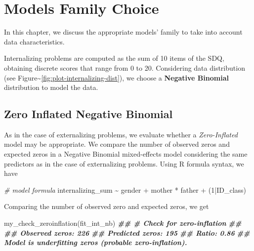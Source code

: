 \documentclass[
]{book}
\newenvironment{Shaded}{\begin{snugshade}}{\end{snugshade}}
\newcommand{\CommentTok}[1]{\textcolor[rgb]{0.56,0.35,0.01}{\textit{#1}}}
\newcommand{\DecValTok}[1]{\textcolor[rgb]{0.00,0.00,0.81}{#1}}
\newcommand{\DocumentationTok}[1]{\textcolor[rgb]{0.56,0.35,0.01}{\textbf{\textit{#1}}}}
\newcommand{\FunctionTok}[1]{\textcolor[rgb]{0.00,0.00,0.00}{#1}}
\newcommand{\NormalTok}[1]{#1}
\newcommand{\SpecialCharTok}[1]{\textcolor[rgb]{0.00,0.00,0.00}{#1}}
\begin{document}
\hypertarget{model-choice-int}{%
\chapter{Models Family Choice}\label{model-choice-int}}

In this chapter, we discuss the appropriate models' family to take into account data characteristics.

Internalizing problems are computed as the sum of 10 items of the SDQ, obtaining discrete scores that range from 0 to 20. Considering data distribution (see Figure\textasciitilde\ref{fig:plot-internalizing-dist}), we choose a \textbf{Negative Binomial} distribution to model the data.

\hypertarget{zero-inflated-negative-binomial-1}{%
\section{Zero Inflated Negative Binomial}\label{zero-inflated-negative-binomial-1}}

As in the case of externalizing problems, we evaluate whether a \emph{Zero-Inflated} model may be appropriate. We compare the number of observed zeros and expected zeros in a Negative Binomial mixed-effects model considering the same predictors as in the case of externalizing problems. Using R formula syntax, we have

\begin{Shaded}
\begin{Highlighting}[]
\CommentTok{\# model formula}
\NormalTok{internalizing\_sum }\SpecialCharTok{\textasciitilde{}}\NormalTok{ gender }\SpecialCharTok{+}\NormalTok{ mother }\SpecialCharTok{*}\NormalTok{ father }\SpecialCharTok{+}\NormalTok{ (}\DecValTok{1}\SpecialCharTok{|}\NormalTok{ID\_class)}
\end{Highlighting}
\end{Shaded}

Comparing the number of observed zero and expected zeros, we get

\begin{Shaded}
\begin{Highlighting}[]
\FunctionTok{my\_check\_zeroinflation}\NormalTok{(fit\_int\_nb)}
\DocumentationTok{\#\# \# Check for zero{-}inflation}
\DocumentationTok{\#\# }
\DocumentationTok{\#\#    Observed zeros: 226}
\DocumentationTok{\#\#   Predicted zeros: 195}
\DocumentationTok{\#\#             Ratio: 0.86}
\DocumentationTok{\#\# Model is underfitting zeros (probable zero{-}inflation).}
\end{Highlighting}
\end{Shaded}
\end{document}
